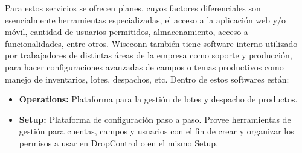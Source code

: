 Para estos servicios se ofrecen planes, cuyos factores diferenciales son esencialmente herramientas especializadas, el acceso a la aplicación web y/o móvil, cantidad de usuarios permitidos, almacenamiento, acceso a funcionalidades, entre otros.
Wiseconn también tiene software interno utilizado por trabajadores de distintas áreas de la empresa como soporte y producción, para hacer configuraciones avanzadas de campos o temas productivos como manejo de inventarios, lotes, despachos, etc. Dentro de estos softwares están:
\begin{itemize}
    \item \textbf{Operations:} Plataforma para la gestión de lotes y despacho de productos.
    \item \textbf{Setup:} Plataforma de configuración paso a paso. Provee herramientas de gestión para cuentas, campos y usuarios con el fin de crear y organizar los permisos a usar en DropControl o en el mismo Setup.
\end{itemize}

